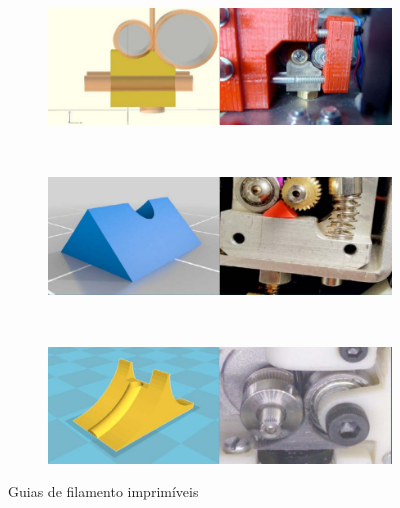 \documentclass[11pt,a4paper]{article}
\begin{document}
\begin{figure}[H]
    \centering
    \begin{subfigure}[b]{0.5\textwidth}
        \includegraphics[width=\textwidth,cfbox=azul_marcos 4pt 0pt]{FOTOS/GUIA1}
    \end{subfigure}
    ~ %
    \begin{subfigure}[b]{0.5\textwidth}
        \includegraphics[width=\textwidth,cfbox=azul_marcos 4pt 0pt]{FOTOS/GUIA2}
    \end{subfigure}
    ~ %
    \begin{subfigure}[b]{0.5\textwidth}
        \includegraphics[width=\textwidth,cfbox=azul_marcos 4pt 0pt]{FOTOS/GUIA3}
    \end{subfigure}
    \caption*{Guias de filamento imprimíveis}
\end{figure}	
\end{document}
